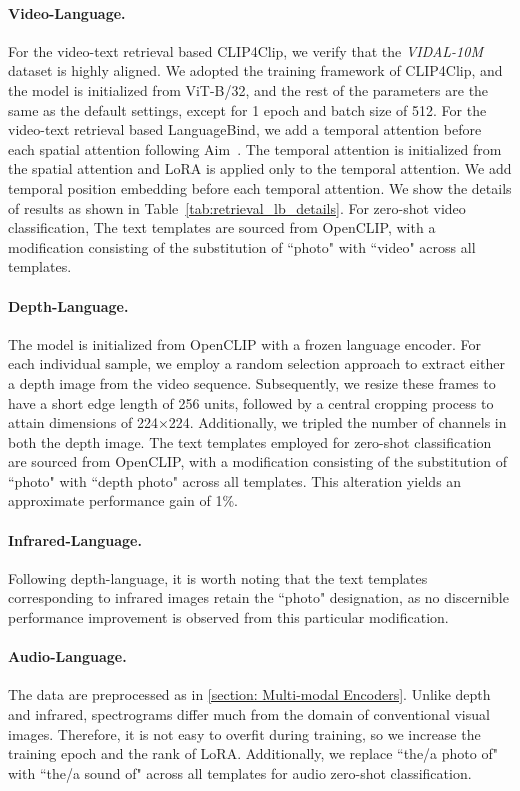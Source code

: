 \documentclass{article} \usepackage{iclr2024_conference,times}
\begin{document}
\paragraph{Video-Language.} For the video-text retrieval based CLIP4Clip, we verify that the \textit{VIDAL-10M} dataset is highly aligned. We adopted the training framework of CLIP4Clip, and the model is initialized from ViT-B/32, and the rest of the parameters are the same as the default settings, except for 1 epoch and batch size of 512. For the video-text retrieval based LanguageBind, we add a temporal attention before each spatial attention following Aim~\citep{yang2023aim}. The temporal attention is initialized from the spatial attention and LoRA is applied only to the temporal attention. We add temporal position embedding before each temporal attention. We show the details of results as shown in Table~\ref{tab:retrieval_lb_details}. For zero-shot video classification, The text templates are sourced from OpenCLIP, with a modification consisting of the substitution of ``photo" with ``video" across all templates.


\paragraph{Depth-Language.} The model is initialized from OpenCLIP with a frozen language encoder. For each individual sample, we employ a random selection approach to extract either a depth image from the video sequence. Subsequently, we resize these frames to have a short edge length of 256 units, followed by a central cropping process to attain dimensions of 224×224. Additionally, we tripled the number of channels in both the depth image. The text templates employed for zero-shot classification are sourced from OpenCLIP, with a modification consisting of the substitution of ``photo" with ``depth photo" across all templates. This alteration yields an approximate performance gain of 1\%. 

\paragraph{Infrared-Language.} Following depth-language, it is worth noting that the text templates corresponding to infrared images retain the ``photo" designation, as no discernible performance improvement is observed from this particular modification.
\paragraph{Audio-Language.} The data are preprocessed as in \ref{section: Multi-modal Encoders}. Unlike depth and infrared, spectrograms differ much from the domain of conventional visual images. Therefore, it is not easy to overfit during training, so we increase the training epoch and the rank of LoRA. Additionally, we replace ``the/a photo of" with ``the/a sound of" across all templates for audio zero-shot classification. 
\end{document}
